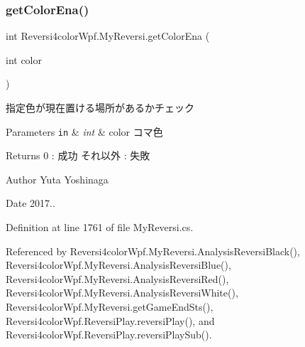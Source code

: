 \subsubsection{\texorpdfstring{get\+Color\+Ena()}{getColorEna()}}
{\footnotesize\ttfamily int Reversi4color\+Wpf.\+My\+Reversi.\+get\+Color\+Ena (\begin{DoxyParamCaption}\item[{int}]{color }\end{DoxyParamCaption})}



指定色が現在置ける場所があるかチェック 


\begin{DoxyParams}[1]{Parameters}
\mbox{\tt in}  & {\em int} & color コマ色 \\
\hline
\end{DoxyParams}
\begin{DoxyReturn}{Returns}
0 \+: 成功 それ以外 \+: 失敗 
\end{DoxyReturn}
\begin{DoxyAuthor}{Author}
Yuta Yoshinaga 
\end{DoxyAuthor}
\begin{DoxyDate}{Date}
2017.. 
\end{DoxyDate}


Definition at line 1761 of file My\+Reversi.\+cs.



Referenced by Reversi4color\+Wpf.\+My\+Reversi.\+Analysis\+Reversi\+Black(), Reversi4color\+Wpf.\+My\+Reversi.\+Analysis\+Reversi\+Blue(), Reversi4color\+Wpf.\+My\+Reversi.\+Analysis\+Reversi\+Red(), Reversi4color\+Wpf.\+My\+Reversi.\+Analysis\+Reversi\+White(), Reversi4color\+Wpf.\+My\+Reversi.\+get\+Game\+End\+Sts(), Reversi4color\+Wpf.\+Reversi\+Play.\+reversi\+Play(), and Reversi4color\+Wpf.\+Reversi\+Play.\+reversi\+Play\+Sub().

